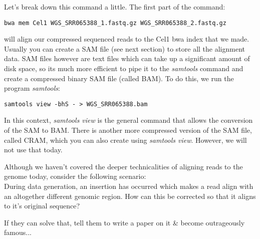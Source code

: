 Let's break down this command a little. The first part of the command:
\begin{lstlisting}[style=command_syntax]
bwa mem Cel1 WGS_SRR065388_1.fastq.gz WGS_SRR065388_2.fastq.gz
\end{lstlisting}
will align our compressed sequenced reads to the Cel1 bwa index that we made.
Usually you can create a SAM file (see next section) to store all the alignment data. SAM files however are text files which can take up a significant amount of disk space, so its much more efficient to pipe it to the \textit{samtools} command and create a compressed binary SAM file (called BAM).
To do this, we run the program \textit{samtools}:
\begin{lstlisting}[style=command_syntax]
samtools view -bhS - > WGS_SRR065388.bam
\end{lstlisting}
In this context, \textit{samtools view} is the general command that allows the conversion of the SAM to BAM.
There is another more compressed version of the SAM file, called CRAM, which you can also create using \textit{samtools view}.
However, we will not use that today.

\begin{advanced}
\begin{questions}
Although we haven't covered the deeper technicalities of aligning reads to the genome today, consider the following scenario:\\

During data generation, an insertion has occurred which makes a read align with an altogether different genomic region.
How can this be corrected so that it aligns to it's original sequence? \\
\begin{answer}
If they can solve that, tell them to write a paper on it \& become outrageously famous...
\end{answer}
\end{questions}
\end{advanced}

